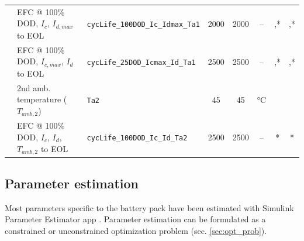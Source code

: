 \begin{table}[H]
\begin{tabular}[t]{cllccccc}
\\[0.28cm]
& \breakcellleft{EFC @ 100\% DOD,\\$I_c$, $I_{d,max}$ to EOL} & \texttt{cycLife\_100DOD\_Ic\_Idmax\_Ta1} & 2000 & 2000 & -- & \cite{battery_research},* & \cite{battery_research},*
\\[0.28cm]
& \breakcellleft{EFC @ 100\% DOD,\\$I_{c,max}$, $I_d$ to EOL} & \texttt{cycLife\_25DOD\_Icmax\_Id\_Ta1} & 2500 & 2500 & -- & \cite{battery_research},* & \cite{battery_research},*
\\[0.28cm]
& \breakcellleft{2nd amb. temperature\\($T_{amb,2}$)} & \texttt{Ta2} & 45 & 45 & °C & \cite{mathworks:battery} & \cite{mathworks:battery}
\\[0.28cm]
& \breakcellleft{EFC @ 100\% DOD,\\$I_c$, $I_d$, $T_{amb,2}$ to EOL} & \texttt{cycLife\_100DOD\_Ic\_Id\_Ta2} & 2500 & 2500 & -- & * & *
\\[0.28cm]
\bottomrule
\end{tabular}
\end{table}

\restoregeometry





\subsection{Parameter estimation}
\label{sec:parameter_estimation}
Most parameters specific to the battery pack have been estimated with Simulink Parameter Estimator app \cite{mathworks:parameter_estimator}. Parameter estimation can be formulated as a constrained or unconstrained optimization problem (sec. \ref{sec:opt_prob}).

